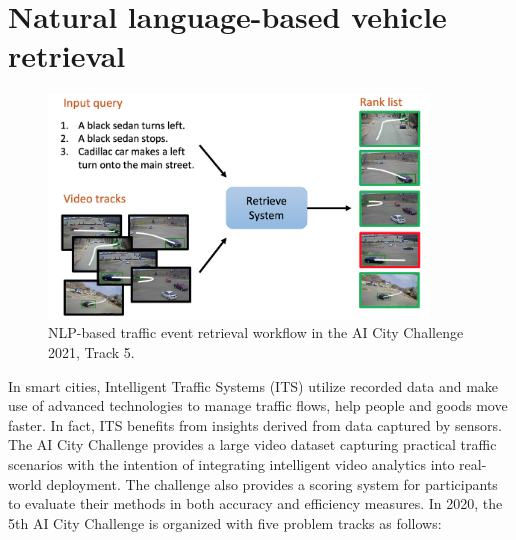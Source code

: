 \section{Natural language-based vehicle retrieval}
\label{sec:ai_city}
\begin{figure}[!ht]
    \centering
    \includegraphics[width=0.9\textwidth]{resources/images/problem_statement.png}
    \caption{NLP-based traffic event retrieval workflow in the AI City Challenge 2021, Track 5.}
    \label{fig:problem_statement}
\end{figure}
In smart cities, Intelligent Traffic Systems (ITS) utilize recorded data and make use of advanced technologies to manage traffic flows, help people and goods move faster. In fact, ITS benefits from insights derived from data captured by sensors. The AI City Challenge \cite{Naphade21AIC21} provides a large video dataset capturing practical traffic scenarios with the intention of integrating intelligent video analytics into real-world deployment. The challenge also provides a scoring system for participants to evaluate their methods in both accuracy and efficiency measures. In 2020, the 5th AI City Challenge is organized with five problem tracks as follows:
